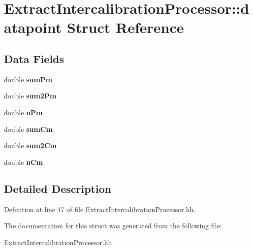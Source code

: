 \section{ExtractIntercalibrationProcessor::datapoint Struct Reference}
\label{structExtractIntercalibrationProcessor_1_1datapoint}
\subsection*{Data Fields}
\begin{DoxyCompactItemize}
\item 
double {\bfseries sumPm}\label{structExtractIntercalibrationProcessor_1_1datapoint_a2296a48fc2edf2484cea3ff63798d776}

\item 
double {\bfseries sum2Pm}\label{structExtractIntercalibrationProcessor_1_1datapoint_aa1bf97ae54daebe458120feb1cd20e5b}

\item 
double {\bfseries nPm}\label{structExtractIntercalibrationProcessor_1_1datapoint_a2cf8aea86179310ef849273ba9aa287c}

\item 
double {\bfseries sumCm}\label{structExtractIntercalibrationProcessor_1_1datapoint_a582f77796997da2d1b842f200420a5a9}

\item 
double {\bfseries sum2Cm}\label{structExtractIntercalibrationProcessor_1_1datapoint_aa530064426d5ddd81d516645f1a1a5b6}

\item 
double {\bfseries nCm}\label{structExtractIntercalibrationProcessor_1_1datapoint_a8426e7b551c47d25856217b8d0b45579}

\end{DoxyCompactItemize}


\subsection{Detailed Description}


Definition at line 47 of file ExtractIntercalibrationProcessor.hh.

The documentation for this struct was generated from the following file:\begin{DoxyCompactItemize}
\item 
ExtractIntercalibrationProcessor.hh\end{DoxyCompactItemize}
